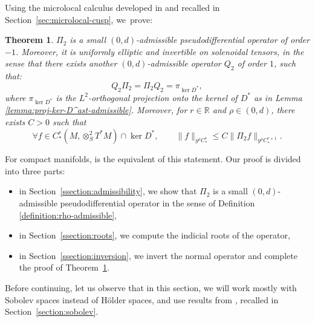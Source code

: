 \documentclass[10pt]{amsart}
\newcommand{\R}{\mathbb{R}}
\theoremstyle{plain}
\newtheorem{theorem}{Theorem}[section]
\theoremstyle{definition}
\begin{document}
Using the microlocal calculus developed in \cite{Bonthonneau-Lefeuvre-19-1} and recalled in Section~\ref{sec:microlocal-cusp}, we~prove:

\begin{theorem}
\label{theorem:main-technical}
$\Pi_2$ is a small $(0,d)$-admissible pseudodifferential operator of order $-1$. Moreover, it is uniformly elliptic and invertible on solenoidal tensors, in the sense that there exists another $(0,d)$-admissible operator $Q_2$ of order $1$, such that:
\[
Q_2\Pi_2 = \Pi_2 Q_2 =\pi_{\ker D^\ast},
\]
where $\pi_{\ker D^\ast}$ is the $L^2$-orthogonal projection onto the kernel of $D^\ast$ as in Lemma \ref{lemma:proj-ker-D^ast-admissible}. Moreover, for $r\in\R$ and $\rho\in (0,d)$, there exists $C > 0$ such that
\begin{equation}
\label{equation:pi2-estimate}
\forall f \in C^r_*(M,\otimes^2_S T^*M) \cap \ker D^*, \qquad \|f\|_{y^\rho C^r_*} \leq C \|\Pi_2f\|_{y^\rho C^{r+1}_*}.
\end{equation}
\end{theorem}

For compact manifolds, \cite[Lem.\,4.9]{Gouezel-Lefeuvre-19} is the equivalent of this statement. Our proof is divided into three parts:
\begin{itemize}
\item in Section~\ref{ssection:admissibility}, we show that $\Pi_2$ is a small $(0,d)$-admissible pseudodifferential operator in the sense of Definition \ref{definition:rho-admissible},
\item in Section~\ref{ssection:roots}, we compute the indicial roots of the operator,
\item in Section~\ref{ssection:inversion}, we invert the normal operator and complete the proof of Theorem~\ref{theorem:main-technical}.
\end{itemize}

Before continuing, let us observe that in this section, we will work mostly with Sobolev spaces instead of Hölder spaces, and use results from \cite{Bonthonneau-Weich-17}, recalled in Section~\ref{section:sobolev}.
\end{document}
